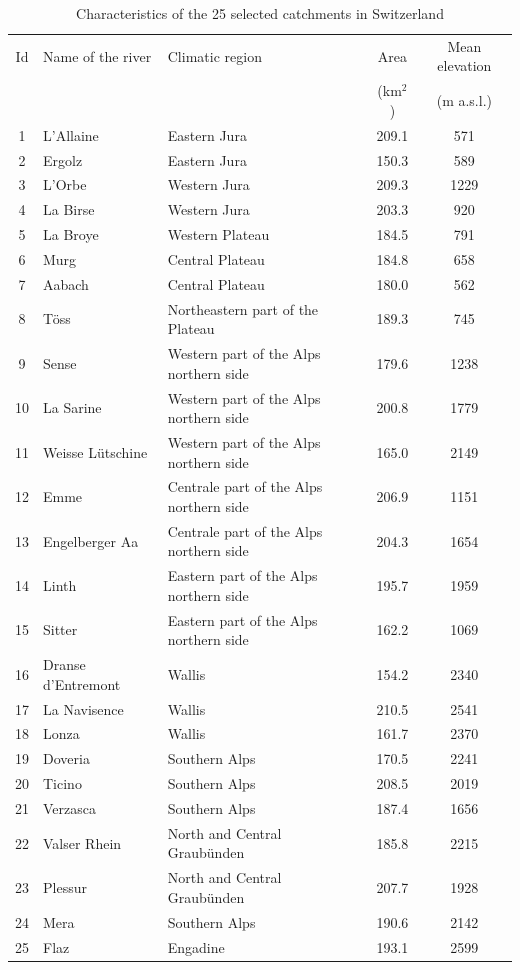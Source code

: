 \documentclass[draft]{agujournal2019}
\begin{document}
\begin{table}[hbt]
	\centering
	\caption{Characteristics of the 25 selected catchments in Switzerland}
	\small
	\begin{tabular}{cllcc}
		\hline 
		Id & Name of the river & Climatic region & Area & Mean elevation \\
		& & & (km$^2$) & (m a.s.l.) \\
		\hline 
		1 & L'Allaine & Eastern Jura & 209.1 & 571 \\
		2 & Ergolz & Eastern Jura & 150.3 & 589 \\
		3 & L'Orbe & Western Jura & 209.3 & 1229 \\
		4 & La Birse & Western Jura & 203.3 & 920 \\
		5 & La Broye & Western Plateau & 184.5 & 791 \\
		6 & Murg & Central Plateau & 184.8 & 658 \\
		7 & Aabach & Central Plateau & 180.0 & 562 \\
		8 & T\"oss & Northeastern part of the Plateau & 189.3 & 745 \\
		9 & Sense & Western part of the Alps northern side & 179.6 & 1238 \\
		10 & La Sarine & Western part of the Alps northern side & 200.8 & 1779 \\
		11 & Weisse L\"utschine & Western part of the Alps northern side & 165.0 & 2149 \\
		12 & Emme & Centrale part of the Alps northern side & 206.9 & 1151 \\
		13 & Engelberger Aa & Centrale part of the Alps northern side & 204.3 & 1654 \\
		14 & Linth & Eastern part of the Alps northern side & 195.7 & 1959 \\
		15 & Sitter & Eastern part of the Alps northern side & 162.2 & 1069 \\
		16 & Dranse d'Entremont & Wallis & 154.2 & 2340 \\
		17 & La Navisence & Wallis & 210.5 & 2541 \\
		18 & Lonza & Wallis & 161.7 & 2370 \\
		19 & Doveria & Southern Alps & 170.5 & 2241 \\
		20 & Ticino & Southern Alps & 208.5 & 2019 \\
		21 & Verzasca & Southern Alps & 187.4 & 1656 \\
		22 & Valser Rhein & North and Central Graubünden & 185.8 & 2215 \\
		23 & Plessur & North and Central Graubünden & 207.7 & 1928 \\
		24 & Mera & Southern Alps & 190.6 & 2142 \\
		25 & Flaz & Engadine & 193.1 & 2599 \\
		\hline 
	\end{tabular} 
	\label{catchments}
\end{table}
\end{document}
